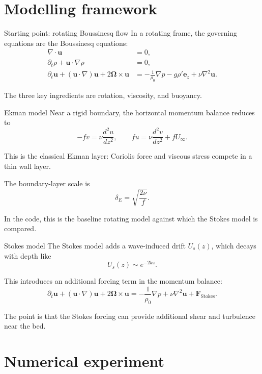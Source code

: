 \documentclass[11pt]{beamer}
\begin{document}
\section{Modelling framework}

\begin{frame}{Starting point: rotating Boussinesq flow}
    In a rotating frame, the governing equations are the Boussinesq equations:
    \begin{align}
        \nabla\cdot\mathbf{u} &= 0, \\
        \partial_t\rho + \mathbf{u}\cdot\nabla\rho &= 0, \\
        \partial_t\mathbf{u} + (\mathbf{u}\cdot\nabla)\mathbf{u} + 2\boldsymbol{\Omega}\times\mathbf{u}
        &= -\frac{1}{\rho_0}\nabla p - g\rho'\mathbf{e}_z + \nu\nabla^2\mathbf{u}.
    \end{align}

    The three key ingredients are rotation, viscosity, and buoyancy.
\end{frame}

\begin{frame}{Ekman model}
    Near a rigid boundary, the horizontal momentum balance reduces to
    \[
    -fv = \nu\frac{d^2u}{dz^2}, \qquad fu = \nu\frac{d^2v}{dz^2} + fU_\infty.
    \]

    This is the classical Ekman layer: Coriolis force and viscous stress compete in a thin wall layer.

    The boundary-layer scale is
    \[
    \delta_E = \sqrt{\frac{2\nu}{f}}.
    \]

    In the code, this is the baseline rotating model against which the Stokes model is compared.
\end{frame}

\begin{frame}{Stokes model}
    The Stokes model adds a wave-induced drift $U_s(z)$, which decays with depth like
    \[
    U_s(z) \sim e^{-2kz}.
    \]

    This introduces an additional forcing term in the momentum balance:
    \[
    \partial_t\mathbf{u} + (\mathbf{u}\cdot\nabla)\mathbf{u} + 2\boldsymbol{\Omega}\times\mathbf{u}
    = -\frac{1}{\rho_0}\nabla p + \nu\nabla^2\mathbf{u} + \mathbf{F}_{\mathrm{Stokes}}.
    \]

    The point is that the Stokes forcing can provide additional shear and turbulence near the bed.
\end{frame}

\section{Numerical experiment}
\end{document}
